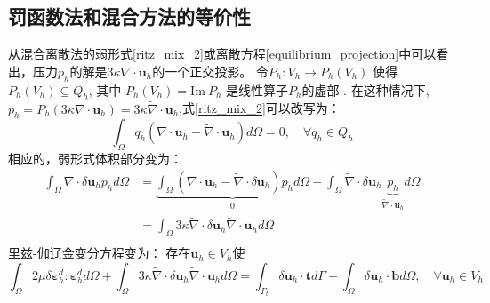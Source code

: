 \subsection{罚函数法和混合方法的等价性}
从混合离散法的弱形式\eqref{ritz_mix_2}或离散方程\eqref{equilibrium_projection}中可以看出，压力$p_h$的解是$3\kappa \nabla \cdot \boldsymbol u_h$的一个正交投影。
令$P_h: V_h \rightarrow P_h(V_h)$ 使得 $P_h(V_h) \subseteq Q_h$, 其中 $P_h(V_h) = \textrm{Im}\:P_h$ 是线性算子$P_h$的虚部 \cite{philippeg.2013}. 
在这种情况下, $p_h = P_h (3\kappa \nabla \cdot \boldsymbol u_h) = 3\kappa \tilde \nabla \cdot \boldsymbol u_h$,式\eqref{ritz_mix_2}可以改写为：
\begin{equation}
    \int_\Omega q_h(\nabla \cdot \boldsymbol u_h - \tilde \nabla \cdot \boldsymbol u_h) d\Omega = 0, \quad \forall q_h \in Q_h
\end{equation}
相应的，弱形式体积部分变为：
\begin{equation}\label{projection_mixed}
    \begin{split}
        \int_\Omega \nabla \cdot \delta \boldsymbol u_h p_h d\Omega &= \underbrace{\int_\Omega (\nabla \cdot \boldsymbol u_h - \tilde \nabla \cdot \delta \boldsymbol u_h) p_h d\Omega}_0 + \int_\Omega \tilde \nabla \cdot \delta \boldsymbol u_h \underbrace{p_h}_{\tilde \nabla \cdot \boldsymbol u_h} d\Omega \\
        &= \int_\Omega 3\kappa \tilde \nabla \cdot \delta \boldsymbol u_h \tilde \nabla \cdot \boldsymbol u_h d\Omega \\
    \end{split}
\end{equation}
里兹-伽辽金变分方程变为：
存在$\boldsymbol u_h \in V_h$使
\begin{equation}
    \int_\Omega 2\mu \delta \boldsymbol \varepsilon^d_h : \boldsymbol \varepsilon^d_h d\Omega +
    \int_\Omega 3\kappa \tilde \nabla \cdot \delta \boldsymbol u_h \tilde \nabla \cdot \boldsymbol u_h d\Omega =
    \int_{\Gamma_t} \delta \boldsymbol u_h \cdot \boldsymbol t d\Gamma + \int_\Omega \delta \boldsymbol u_h \cdot \boldsymbol b d\Omega, \quad \forall \boldsymbol u_h \in V_h
\end{equation}

